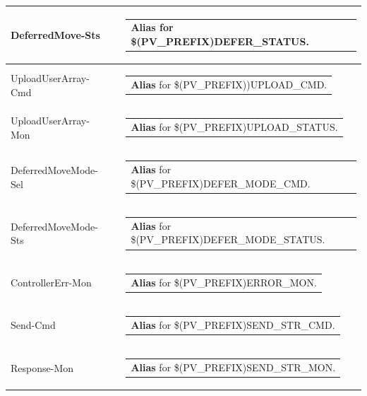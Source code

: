 \documentclass[openany]{article}
\begin{document}
\begin{longtable}{| m{4.5cm} m{2.5cm}  m{8.5cm} |}
        DeferredMove-Sts &  & \begin{tabular}{@{}m{6cm}@{}}
                \textbf{\color{blue} Alias} for \$(PV\_PREFIX)DEFER\_STATUS.
            \end{tabular} \hypertarget{pv:upload-user-array-cmd}{}\\ \hline
        UploadUserArray-Cmd &  & \begin{tabular}{@{}m{6cm}@{}}
                \textbf{\color{blue} Alias} for \$(PV\_PREFIX))UPLOAD\_CMD.
            \end{tabular} \hypertarget{pv:upload-user-array-mon}{}\\ \hline
        UploadUserArray-Mon &  & \begin{tabular}{@{}m{6cm}@{}}
                \textbf{\color{blue} Alias} for \$(PV\_PREFIX)UPLOAD\_STATUS.
            \end{tabular} \hypertarget{pv:deferred-move-mode}{}\\ \hline
        DeferredMoveMode-Sel &  & \begin{tabular}{@{}m{6cm}@{}}
                \textbf{\color{blue} Alias} for \$(PV\_PREFIX)DEFER\_MODE\_CMD.
            \end{tabular} \hypertarget{}{}\\ \hline
        DeferredMoveMode-Sts &  & \begin{tabular}{@{}m{6cm}@{}}
                \textbf{\color{blue} Alias} for \$(PV\_PREFIX)DEFER\_MODE\_STATUS.
            \end{tabular} \hypertarget{pv:controller-err-mon}{}\\ \hline
        ControllerErr-Mon &  & \begin{tabular}{@{}m{6cm}@{}}
                \textbf{\color{blue} Alias} for \$(PV\_PREFIX)ERROR\_MON.
            \end{tabular} \hypertarget{pv:send-cmd}{}\\ \hline
        Send-Cmd &  & \begin{tabular}{@{}m{6cm}@{}}
                \textbf{\color{blue} Alias} for \$(PV\_PREFIX)SEND\_STR\_CMD.
            \end{tabular} \hypertarget{pv:response-mon}{}\\ \hline
        Response-Mon &  & \begin{tabular}{@{}m{6cm}@{}}
                \textbf{\color{blue} Alias} for \$(PV\_PREFIX)SEND\_STR\_MON.

\end{tabular}
\end{longtable}
\end{document}
